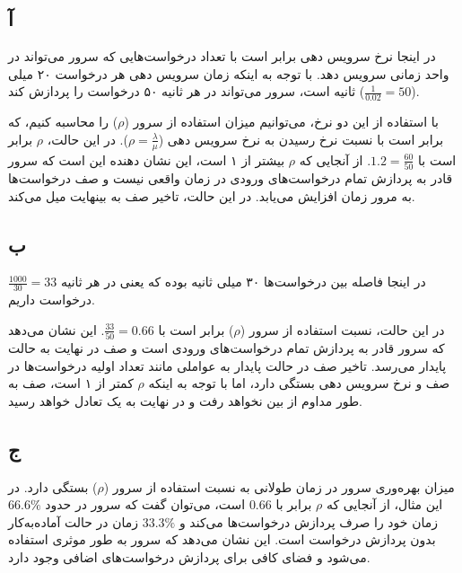 \subsection*{آ}
در اینجا نرخ سرویس دهی برابر است با تعداد درخواست‌هایی که سرور می‌تواند در واحد زمانی سرویس دهد. با توجه به اینکه زمان سرویس دهی هر درخواست ۲۰ میلی ثانیه است، سرور می‌تواند در هر ثانیه ۵۰ درخواست را پردازش کند ($\frac{1}{0.02} = 50$).

با استفاده از این دو نرخ، می‌توانیم میزان استفاده از سرور ($\rho$) را محاسبه کنیم، که برابر است با نسبت نرخ رسیدن به نرخ سرویس دهی ($\rho = \frac{\lambda }{\mu}$). در این حالت، $\rho$ برابر است با $1.2 = \frac{60}{50}$. از آنجایی که $\rho$ بیشتر از ۱ است، این نشان دهنده این است که سرور قادر به پردازش تمام درخواست‌های ورودی در زمان واقعی نیست و صف درخواست‌ها به مرور زمان افزایش می‌یابد. در این حالت، تاخیر صف به بینهایت میل می‌کند.

\subsection*{ب}
در اینجا فاصله بین درخواست‌ها ۳۰ میلی ثانیه بوده که یعنی در هر ثانیه 
$\frac{1000}{30} = 33$
درخواست داریم.

در این حالت، نسبت استفاده از سرور ($\rho$) برابر است با $\frac{33}{50} = 0.66$. این نشان می‌دهد که سرور قادر به پردازش تمام درخواست‌های ورودی است و صف در نهایت به حالت پایدار می‌رسد. تاخیر صف در حالت پایدار به عواملی مانند تعداد اولیه درخواست‌ها در صف و نرخ سرویس دهی بستگی دارد، اما با توجه به اینکه $\rho$ کمتر از ۱ است، صف به طور مداوم از بین نخواهد رفت و در نهایت به یک تعادل خواهد رسید.


\subsection*{ج}
میزان بهره‌وری سرور در زمان طولانی به نسبت استفاده از سرور ($\rho$) بستگی دارد. در این مثال، از آنجایی که $\rho$ برابر با $0.66$ است، می‌توان گفت که سرور در حدود $66.6\%$ زمان خود را صرف پردازش درخواست‌ها می‌کند و $33.3\%$ زمان در حالت آماده‌به‌کار بدون پردازش درخواست است. این نشان می‌دهد که سرور به طور موثری استفاده می‌شود و فضای کافی برای پردازش درخواست‌های اضافی وجود دارد.